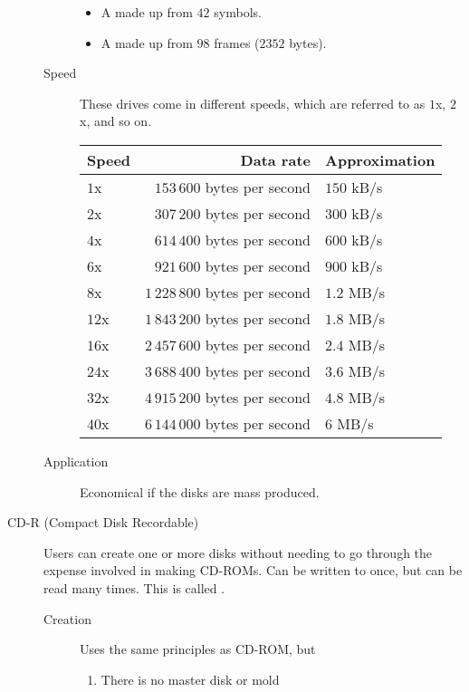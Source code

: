 \documentclass[\main/notes.tex]{subfiles}
\begin{document}
\begin{indentparagraph}
\begin{description}
\begin{description}
\begin{itemize}[nosep]
											\item A  made up from $42$ symbols.
											\item A  made up from $98$ frames ($2352$ bytes).
										\end{itemize}
									\pagebreak
									\item[Speed] These drives come in different speeds, which are referred to as $1$x, $2$x, and so on.
										\begin{center}
											\begin{tabular}{lrl}
												Speed & Data rate & Approximation\\
												\midrule
												$1$x  & $153\,600$ bytes per second    & $150$ kB/s\\
												$2$x  & $307\,200$ bytes per second    & $300$ kB/s\\
												$4$x  & $614\,400$ bytes per second    & $600$ kB/s\\
												$6$x  & $921\,600$ bytes per second    & $900$ kB/s\\
												$8$x  & $1\,228\,800$ bytes per second & $1.2$ MB/s\\
												$12$x & $1\,843\,200$ bytes per second & $1.8$ MB/s\\
												$16$x & $2\,457\,600$ bytes per second & $2.4$ MB/s\\
												$24$x & $3\,688\,400$ bytes per second & $3.6$ MB/s\\
												$32$x & $4\,915\,200$ bytes per second & $4.8$ MB/s\\
												$40$x & $6\,144\,000$ bytes per second & $6$ MB/s
											\end{tabular}
										\end{center}
									\item[Application] Economical if the disks are mass produced. 
								\end{description}
							\item[CD-R (Compact Disk Recordable)] Users can create one or more disks without needing to go through the expense involved in making CD-ROMs. Can be written to once, but can be read many times. This is called .
								\begin{description}
									\item[Creation] Uses the same principles as CD-ROM, but
										\begin{enumerate}[label=\alph*, nosep]
											\item There is no master disk or mold

\end{enumerate}
\end{description}
\end{description}
\end{indentparagraph}
\end{document}
